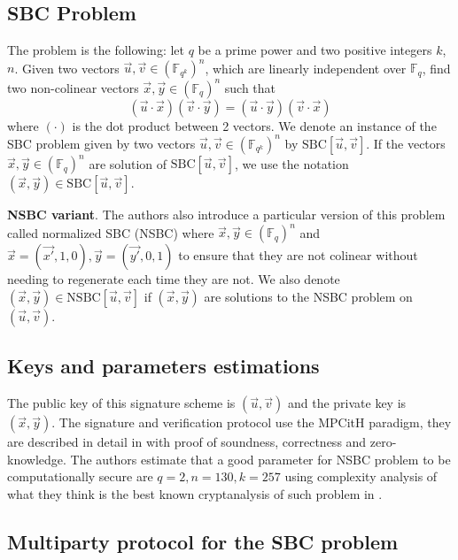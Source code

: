\documentclass[english]{article}
\begin{document}
		\subsection{SBC Problem}
		The problem is the following: let $q$ be a prime power and two positive integers $k$, $n$.
		\newline
		Given two vectors $\vec{u}, \vec{v} \in (\mathbb{F}_{q^k})^n$, which are linearly independent over $\mathbb{F}_q$, find two non-colinear vectors $\vec{x}, \vec{y} \in (\mathbb{F}_q)^n$ such that $$(\vec{u} \cdot \vec{x})(\vec{v} \cdot \vec{y}) = (\vec{u} \cdot \vec{y})(\vec{v} \cdot \vec{x})$$
		where $(\cdot)$ is the dot product between 2 vectors.
		We denote an instance of the SBC problem given by two vectors $\vec{u}, \vec{v} \in (\mathbb{F}_{q^k})^n$ by $\text{SBC}[\vec{u}, \vec{v}]$. If the vectors $\vec{x},\vec{y} \in (\mathbb{F}_q)^n$ are solution of $\text{SBC}[\vec{u},\vec{v}]$, we use the notation $(\vec{x}, \vec{y}) \in \text{SBC}[\vec{u}, \vec{v}]$.
		
		\textbf{NSBC variant}.
		The authors also introduce a particular version of this problem called normalized SBC (NSBC) where $\vec{x}, \vec{y} \in (\mathbb{F}_q)^n$ and
		$\vec{x} = (\vec{x'}, 1, 0), \vec{y} = (\vec{y'}, 0, 1)$ to ensure that they are not colinear without needing to regenerate each time they are not. We also denote $(\vec{x}, \vec{y}) \in \text{NSBC}[\vec{u}, \vec{v}]$ if $(\vec{x}, \vec{y})$ are solutions to the NSBC problem on $(\vec{u}, \vec{v})$.
		
		\subsection{Keys and parameters estimations}
		The public key of this signature scheme is $(\vec{u},\vec{v})$ and the private key is $(\vec{x}, \vec{y})$.
		The signature and verification protocol use the MPCitH paradigm, they are described in detail in \cite{HJ23} with proof of soundness, correctness and zero-knowledge.
		The authors estimate that a good parameter for NSBC problem to be computationally secure are $q = 2, n = 130, k = 257$ using complexity analysis of what they think is the best known cryptanalysis of such problem in \cite{FSS11}.
		
		\subsection{Multiparty protocol for the SBC problem}
		
		
		
\end{document}
